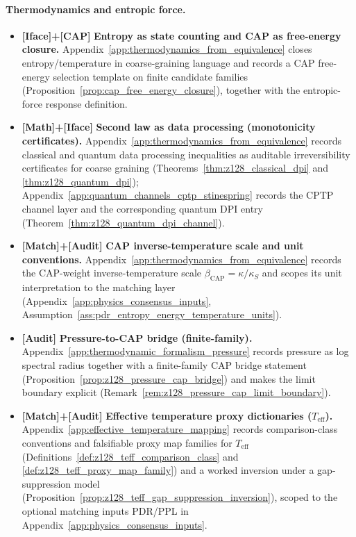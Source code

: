 \paragraph{Thermodynamics and entropic force.}
\begin{itemize}
\item \textbf{[Iface]+[CAP]} \textbf{Entropy as state counting and CAP as free-energy closure.}
Appendix~\ref{app:thermodynamics_from_equivalence} closes entropy/temperature in coarse-graining language and records a CAP free-energy selection template on finite candidate families (Proposition~\ref{prop:cap_free_energy_closure}), together with the entropic-force response definition.
\item \textbf{[Math]+[Iface]} \textbf{Second law as data processing (monotonicity certificates).}
Appendix~\ref{app:thermodynamics_from_equivalence} records classical and quantum data processing inequalities as auditable irreversibility certificates for coarse graining (Theorems~\ref{thm:z128_classical_dpi} and \ref{thm:z128_quantum_dpi}); Appendix~\ref{app:quantum_channels_cptp_stinespring} records the CPTP channel layer and the corresponding quantum DPI entry (Theorem~\ref{thm:z128_quantum_dpi_channel}).
\item \textbf{[Match]+[Audit]} \textbf{CAP inverse-temperature scale and unit conventions.}
Appendix~\ref{app:thermodynamics_from_equivalence} records the CAP-weight inverse-temperature scale $\beta_{\mathrm{CAP}}=\kappa/\kappa_S$ and scopes its unit interpretation to the matching layer (Appendix~\ref{app:physics_consensus_inputs}, Assumption~\ref{ass:pdr_entropy_energy_temperature_units}).
\item \textbf{[Audit]} \textbf{Pressure-to-CAP bridge (finite-family).}
Appendix~\ref{app:thermodynamic_formalism_pressure} records pressure as log spectral radius together with a finite-family CAP bridge statement (Proposition~\ref{prop:z128_pressure_cap_bridge}) and makes the limit boundary explicit (Remark~\ref{rem:z128_pressure_cap_limit_boundary}).
\item \textbf{[Match]+[Audit]} \textbf{Effective temperature proxy dictionaries ($T_{\mathrm{eff}}$).}
Appendix~\ref{app:effective_temperature_mapping} records comparison-class conventions and falsifiable proxy map families for $T_{\mathrm{eff}}$ (Definitions~\ref{def:z128_teff_comparison_class} and \ref{def:z128_teff_proxy_map_family}) and a worked inversion under a gap-suppression model (Proposition~\ref{prop:z128_teff_gap_suppression_inversion}), scoped to the optional matching inputs PDR/PPL in Appendix~\ref{app:physics_consensus_inputs}.
\end{itemize}

